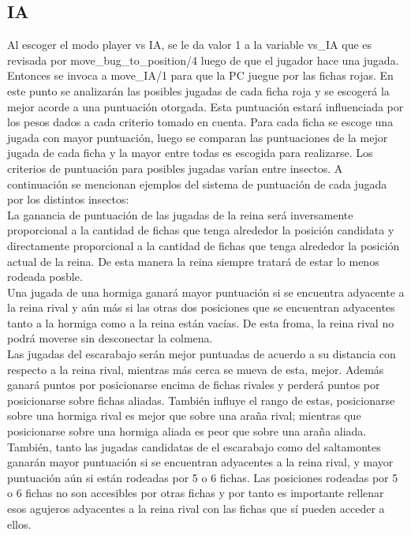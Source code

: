 \documentclass[a4paper,12pt]{article}
\begin{document}
\subsection*{IA}
Al escoger el modo player vs IA, se le da valor 1 a la variable vs\_IA que es revisada por move\_bug\_to\_position/4 luego de que el jugador hace una jugada. Entonces se invoca a move\_IA/1 para que la PC juegue por las fichas rojas. En este punto se analizarán las posibles jugadas de cada ficha roja y se escogerá la mejor acorde a una puntuación otorgada. Esta puntuación estará influenciada por los pesos dados a cada criterio tomado en cuenta. Para cada ficha se escoge una jugada con mayor puntuación, luego se comparan las puntuaciones de la mejor jugada de cada ficha y la mayor entre todas es escogida para realizarse. Los criterios de puntuación para posibles jugadas varían entre insectos. A continuación se mencionan ejemplos del sistema de puntuación de cada jugada por los distintos insectos:\\
La ganancia de puntuación de las jugadas de la reina será inversamente proporcional a la cantidad de fichas que tenga alrededor la posición candidata y directamente proporcional a la cantidad de fichas que tenga alrededor la posición actual de la reina. De esta manera la reina siempre tratará de estar lo menos rodeada posble.\\
Una jugada de una hormiga ganará mayor puntuación si se encuentra adyacente a la reina rival y aún más si las otras dos posiciones que se encuentran adyacentes tanto a la hormiga como a la reina están vacías. De esta froma, la reina rival no podrá moverse sin desconectar la colmena.\\
Las jugadas del escarabajo serán mejor puntuadas de acuerdo a su distancia con respecto a la reina rival, mientras más cerca se mueva de esta, mejor. Además ganará puntos por posicionarse encima de fichas rivales y perderá puntos por posicionarse sobre fichas aliadas. También influye el rango de estas, posicionarse sobre una hormiga rival es mejor que sobre una araña rival; mientras que posicionarse sobre una hormiga aliada es peor que sobre una araña aliada.\\
También, tanto las jugadas candidatas de el escarabajo como del saltamontes ganarán mayor puntuación si se encuentran adyacentes a la reina rival, y mayor puntuación aún si están rodeadas por 5 o 6 fichas. Las posiciones rodeadas por 5 o 6 fichas no son accesibles por otras fichas y por tanto es importante rellenar esos agujeros adyacentes a la reina rival con las fichas que sí pueden acceder a ellos.\\
\end{document}
